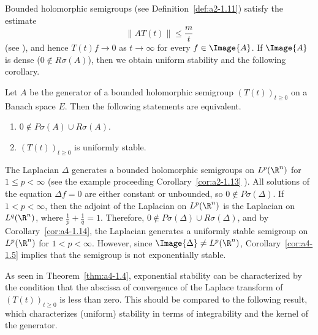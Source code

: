 Bounded holomorphic semigroups (see Definition~\ref{def:a2-1.11}) satisfy the estimate
\[\|AT(t)\| \leq \frac{m}{t}\]
(see \textcite[p.33]{goldstein:1985a}), and hence $T(t)f \to 0$ as $t \to \infty$
for every $f \in \Image{A}$. 
If\/ $\Image{A}$ is dense (\ie $0 \not\in R\sigma(A)$), then we obtain
uniform stability and the following corollary.
\begin{corollary}\label{cor:a4-1.14}
Let $A$ be the generator of a bounded holomorphic
semigroup $(T(t))_{t \geq 0}$ on a Banach space $E$. 
Then the following statements are equivalent.
\begin{enumerate}[\upshape (a)]
\item 
$0 \not\in P\sigma(A) \cup R\sigma(A)$.

\item 
$(T(t))_{t \geq 0}$ is uniformly stable.

\end{enumerate}
\end{corollary}
\begin{example}\label{ex:a4-15}
The Laplacian $\Delta$ generates a bounded holomorphic semigroups on $L^{p}(\R^{n})$ for $1 \leq p < \infty$ (see the example proceeding
Corollary~\ref{cor:a2-1.13} ).
All solutions of the equation $\Delta f = 0$ are either constant
or unbounded, so $0 \not\in P\sigma(\Delta)$. 
If\/ $1 < p < \infty$, then the adjoint
of the Laplacian on $L^{p}(\R^{n})$ is the Laplacian on $L^{q}(\R^{n})$, where
$\frac{1}{p} + \frac{1}{q} = 1$. 
Therefore, $0 \not\in P\sigma(\Delta) \cup R\sigma(\Delta)$, and by Corollary~\ref{cor:a4-1.14},
the Laplacian generates a uniformly stable semigroup on  $L^{p}(\R^{n})$
for $1 < p < \infty$. However, since $\Image{ \Delta} \not= L^{p}(\R^{n})$, Corollary~\ref{cor:a4-1.5} implies that the semigroup is not exponentially stable. %
\end{example}
As seen in Theorem~\ref{thm:a4-1.4}, exponential stability can be characterized by the condition that the abscissa of convergence of the Laplace transform of\/ $(T(t))_{t \geq 0}$ is less than zero. 
This should be compared to the following result, which characterizes (uniform) stability in terms of integrability and the kernel of the generator.
